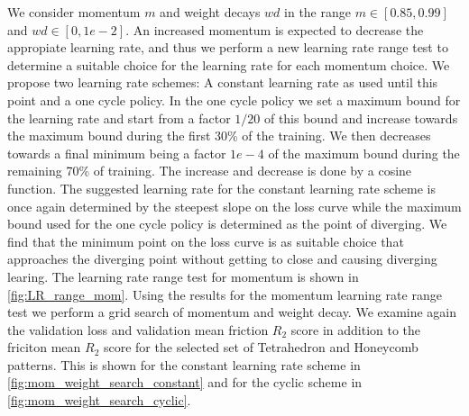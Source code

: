 We consider momentum $m$ and weight decays $wd$ in the range $m \in [0.85,
0.99]$ and $wd \in [0, 1e-2]$. An increased momentum is expected to decrease the
appropiate learning rate, and thus we perform a new learning rate range
test to determine a suitable choice for the learning rate for each momentum choice. We propose two learning rate schemes: A constant learning rate as used until this point and a one cycle policy. In the one cycle policy we set a maximum bound for the learning rate and start from a factor $1/20$ of this bound and increase towards the maximum bound during the first 30\% of the
training. We then decreases towards a final minimum being a factor $1e-4$ of the maximum bound during the remaining 70\% of training. The increase and decrease is done by a cosine function. The suggested learning rate for the constant learning rate scheme is once again determined by the steepest slope on the loss curve while the maximum bound used for the one cycle policy is determined as the point of diverging. We find that the minimum point on the loss curve is as suitable choice that approaches the diverging point without getting to close and causing
diverging learing. The learning rate range test for momentum is shown in \cref{fig:LR_range_mom}. Using the results for the momentum learning rate range test we perform a grid search of momentum and weight decay. We examine again the validation loss and validation mean friction $R_2$ score in addition to the friciton mean $R_2$ score for the selected set of Tetrahedron and Honeycomb patterns. This is shown for the constant learning rate scheme in \cref{fig:mom_weight_search_constant} and for the cyclic scheme in \cref{fig:mom_weight_search_cyclic}.

